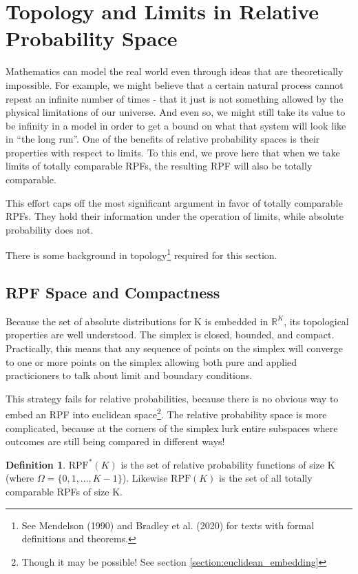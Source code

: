 \documentclass[twoside]{article}
\newcommand{\quotes}[1]{``#1''}
\theoremstyle{plain}%
\theoremstyle{definition}
\newtheorem{definition}{Definition}[section]
\theoremstyle{remark}
\begin{document}
\section{Topology and Limits in Relative Probability Space}

Mathematics can model the real world even through ideas that are theoretically impossible. For example, we might believe that a certain natural process cannot repeat an infinite number of times - that it just is not something allowed by the physical limitations of our universe. And even so, we might still take its value to be infinity in a model in order to get a bound on what that system will look like in \quotes{the long run}. One of the benefits of relative probability spaces is their properties with respect to limits. To this end, we prove here that when we take limits of totally comparable RPFs, the resulting RPF will also be totally comparable.

This effort caps off the most significant argument in favor of totally comparable RPFs. They hold their information under the operation of limits, while absolute probability does not.

There is some background in topology\footnote{See Mendelson (1990) \cite{mendelson} and Bradley et al. (2020) \cite{bradley} for texts with formal definitions and theorems.} required for this section.

\subsection{RPF Space and Compactness}

Because the set of absolute distributions for K is embedded in \(\mathbb{R}^K\), its topological properties are well understood. The simplex is closed, bounded, and compact. Practically, this means that any sequence of points on the simplex will converge to one or more points on the simplex allowing both pure and applied practicioners to talk about limit and boundary conditions.

This strategy fails for relative probabilities, because there is no obvious way to embed an RPF into euclidean space\footnote{Though it may be possible! See section \ref{section:euclidean_embedding}}. The relative probability space is more complicated, because at the corners of the simplex lurk entire subspaces where outcomes are still being compared in different ways!

\begin{definition}
\(\text{RPF}^{\ast}(K)\) is the set of relative probability functions of size K (where \(\Omega = \{0, 1, ..., K - 1\}\)). Likewise \(\text{RPF}(K)\) is the set of all totally comparable RPFs of size K.
\end{definition}
\end{document}
